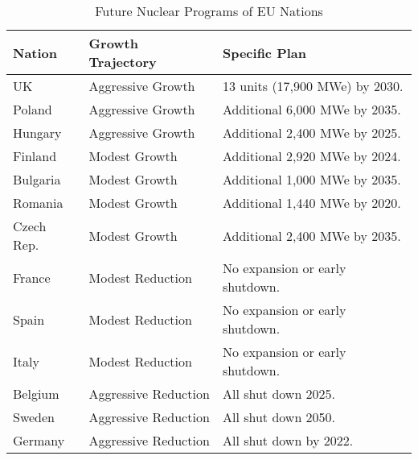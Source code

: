 \begin{table}[h]
	\centering
		\begin{tabularx}{\textwidth}{lmb}
			\hline 
			
			\textbf{Nation} & \textbf{Growth Trajectory} & \textbf{Specific Plan }\\
			\hline
			UK & Aggressive Growth & {\small  13 units (17,900 MWe) by 2030.}\\
			\hline
			Poland & Aggressive Growth &  {\small Additional 6,000 MWe by 2035.}\\
			\hline
			Hungary & Aggressive Growth &  {\small Additional 2,400 MWe by 2025.} \\ 
			\hline
			Finland & Modest Growth &  {\small Additional 2,920 MWe by 2024.}\\
			\hline
			Bulgaria & Modest Growth &  {\small Additional 1,000 MWe by 2035.} \\
			\hline
			Romania & Modest Growth &  {\small Additional 1,440 MWe by 2020.} \\
			\hline
			Czech Rep. & Modest Growth & {\small  Additional 2,400 MWe by 2035.}\\
			\hline
			France & Modest Reduction & {\small No expansion or early shutdown.}\\
			\hline
			Spain & Modest Reduction &  {\small No expansion or early shutdown.} \\
			\hline
			Italy & Modest Reduction & {\small No expansion or early shutdown. }\\
			\hline
			Belgium & Aggressive Reduction & All shut down 2025.\\
			\hline
			Sweden & Aggressive Reduction & All shut down 2050.\\
			\hline
			Germany & Aggressive Reduction & All shut down by 2022.\\
			\hline
			
		\end{tabularx}

	\caption {Future Nuclear Programs of \gls{EU} Nations \cite{world_nuclear_association_nuclear_2017}}
  \label{tab:eu_growth}
\end{table}
\FloatBarrier
